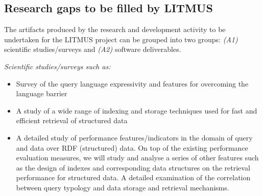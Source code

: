 \documentclass{llncs}
\begin{document}

    
    \subsection{Research gaps to be filled by LITMUS}
    The artifacts produced by the research and development activity to be undertaken for the LITMUS project can be grouped into two groups: \textit{(A1)} scientific studies/surveys and \textit{(A2)} software deliverables. 
    
    \textit{ Scientific studies/surveys such as:} 
        \begin{itemize}
            \item Survey of the query language expressivity and features for overcoming the language barrier
            \item A study of a wide range of indexing and storage techniques used for fast and efficient retrieval of structured data
            \item A detailed study of performance features/indicators in the domain of query and data over RDF (structured) data. On top of the existing performance evaluation measures, we will study and analyse a series of other features such as the design of indexes and corresponding data structures on the retrieval performance for structured data. A detailed examination of the correlation between query typology and data storage and retrieval mechanisms.
        \end{itemize}
        
\end{document}
